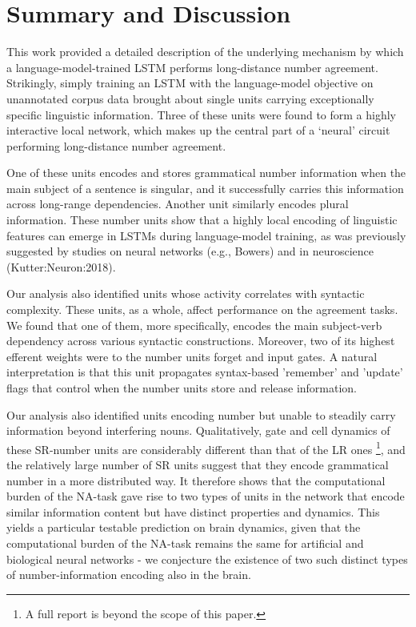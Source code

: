 
\section{Summary and Discussion}
This work provided a detailed description of the underlying mechanism by which a language-model-trained LSTM performs long-distance  number agreement. %
Strikingly, simply training an LSTM with the language-model objective on unannotated corpus data brought about single units carrying exceptionally specific linguistic information. Three of these units were found to form a highly interactive local network, which makes up the central part of a `neural' circuit performing long-distance number agreement.

One of these units encodes and stores grammatical number information when the main subject of a sentence is singular, and it successfully carries this information across long-range dependencies. Another unit similarly encodes plural information. These number units show that a highly local encoding of linguistic features can emerge in LSTMs during language-model training, as was previously suggested by studies on neural networks (e.g., Bowers) and in neuroscience (Kutter:Neuron:2018).

Our analysis also identified units whose activity correlates with syntactic complexity. These units, as a whole, affect performance on the agreement tasks. We found that one of them, more specifically, encodes the main subject-verb dependency across various syntactic constructions. Moreover, two of its highest efferent weights were to the number units forget and input gates. A natural interpretation is that this unit propagates syntax-based 'remember' and 'update' flags that control when the number units store and release information. %

Our analysis also identified units encoding number  but unable to steadily carry  information beyond interfering nouns. Qualitatively, gate and cell dynamics of these SR-number units are considerably different than that of the LR ones \footnote{A full report is beyond the scope of this paper.}, and the relatively large number of SR units suggest that they encode grammatical number in a more distributed way. It therefore shows that the computational burden of the NA-task gave rise to two types of units in the network that encode similar information content but have distinct properties and dynamics. This yields a particular testable prediction on brain dynamics, given that the computational burden of the NA-task remains the same for artificial and biological neural networks - we conjecture the existence of two such distinct types of number-information encoding also in the brain.

